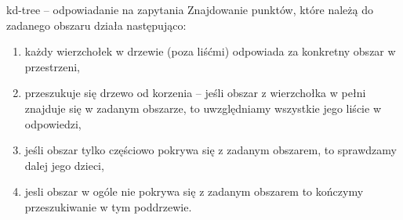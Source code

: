 \documentclass[aspectratio=169,dvipsnames]{beamer}
\begin{document}
\begin{frame}{kd-tree -- odpowiadanie na zapytania}
    Znajdowanie punktów, które należą do zadanego obszaru działa następująco:
    \begin{enumerate}
        \item<2-> każdy wierzchołek w drzewie (poza liśćmi) odpowiada za konkretny obszar w przestrzeni,
        \item<3-> przeszukuje się drzewo od korzenia -- jeśli obszar z wierzchołka w pełni znajduje się w zadanym obszarze, to uwzględniamy wszystkie jego liście w odpowiedzi,
        \item<4-> jeśli obszar tylko częściowo pokrywa się z zadanym obszarem, to sprawdzamy dalej jego dzieci,
        \item<5-> jesli obszar w ogóle nie pokrywa się z zadanym obszarem to kończymy przeszukiwanie w tym poddrzewie.
    \end{enumerate}
\end{frame}
\end{document}
